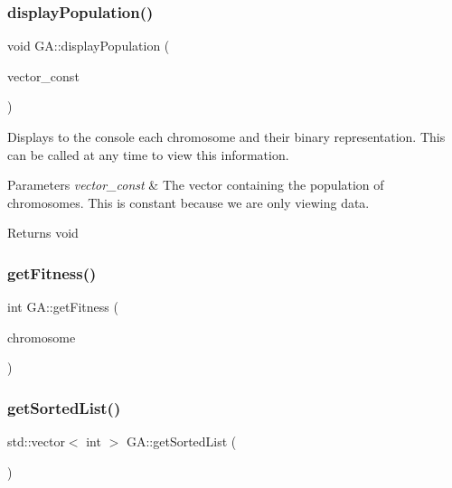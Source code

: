 \subsubsection{\texorpdfstring{display\+Population()}{displayPopulation()}}
{\footnotesize\ttfamily void G\+A\+::display\+Population (\begin{DoxyParamCaption}\item[{const std\+::vector$<$ std\+::vector$<$ std\+::string $>$$>$}]{vector\+\_\+const }\end{DoxyParamCaption})}



Displays to the console each chromosome and their binary representation. This can be called at any time to view this information. 


\begin{DoxyParams}{Parameters}
{\em vector\+\_\+const} & The vector containing the population of chromosomes. This is constant because we are only viewing data. \\
\hline
\end{DoxyParams}
\begin{DoxyReturn}{Returns}
void 
\end{DoxyReturn}
\hypertarget{class_g_a_a1410614c7bc1e10f428039e95b5056bc}{}\label{class_g_a_a1410614c7bc1e10f428039e95b5056bc} 
\subsubsection{\texorpdfstring{get\+Fitness()}{getFitness()}}
{\footnotesize\ttfamily int G\+A\+::get\+Fitness (\begin{DoxyParamCaption}\item[{std\+::vector$<$ std\+::string $>$}]{chromosome }\end{DoxyParamCaption})}

\hypertarget{class_g_a_aae44c594b59257c78ea06d1811cfef98}{}\label{class_g_a_aae44c594b59257c78ea06d1811cfef98} 
\subsubsection{\texorpdfstring{get\+Sorted\+List()}{getSortedList()}}
{\footnotesize\ttfamily std\+::vector$<$ int $>$ G\+A\+::get\+Sorted\+List (\begin{DoxyParamCaption}{ }\end{DoxyParamCaption})}

